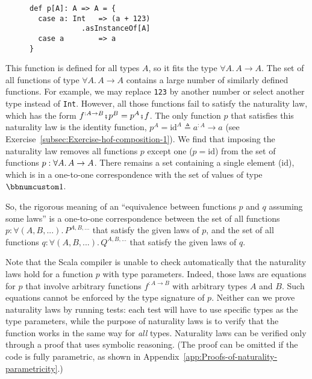 \begin{wrapfigure}{l}{0.295\columnwidth}%
\vspace{-1\baselineskip}
\begin{lstlisting}
def p[A]: A => A = {
  case a: Int   => (a + 123)
            .asInstanceOf[A]
  case a        => a
}
\end{lstlisting}

\vspace{-1\baselineskip}
\end{wrapfigure}%

\noindent This function is defined for all types $A$, so it fits
the type $\forall A.\,A\rightarrow A$. The set of all functions of
type $\forall A.\,A\rightarrow A$ contains a large number of similarly
defined functions. For example, we may replace \lstinline!123! by
another number or select another type instead of \lstinline!Int!.
However, all those functions fail to satisfy the naturality law, which
has the form $f^{:A\rightarrow B}\bef p^{B}=p^{A}\bef f$. The only
function $p$ that satisfies this naturality law is the identity function,
$p^{A}=\text{id}^{A}\triangleq a^{:A}\rightarrow a$ (see Exercise~\ref{subsec:Exercise-hof-composition-1}).
We find that imposing the naturality law removes all functions $p$
except one ($p=\text{id}$) from the set of functions $p:\text{\ensuremath{\forall A.\,A\rightarrow A}}$.
There remains a set containing a single element ($\text{id}$), which
is in a one-to-one correspondence with the set of values of type $\bbnum 1$.

So, the rigorous meaning of an \textsf{``}equivalence between functions $p$
and $q$ assuming some laws\textsf{''} is a one-to-one correspondence between
the set of all functions $p:\forall(A,B,...).\,P^{A,B,...}$ that
satisfy the given laws of $p$, and the set of all functions $q:\forall(A,B,...).\,Q^{A,B,...}$
that satisfy the given laws of $q$.

Note that the Scala compiler is unable to check automatically that
the naturality laws hold for a function $p$ with type parameters.
Indeed, those laws are equations for $p$ that involve arbitrary functions
$f^{:A\rightarrow B}$ with arbitrary types $A$ and $B$. Such equations
cannot be enforced by the type signature of $p$. Neither can we prove
naturality laws by running tests: each test will have to use specific
types as the type parameters, while the purpose of naturality laws
is to verify that the function works in the same way for \emph{all}
types. Naturality laws can be verified only through a proof that uses
symbolic reasoning. (The proof can be omitted if the code is fully
parametric, as shown in Appendix~\ref{app:Proofs-of-naturality-parametricity}.)

